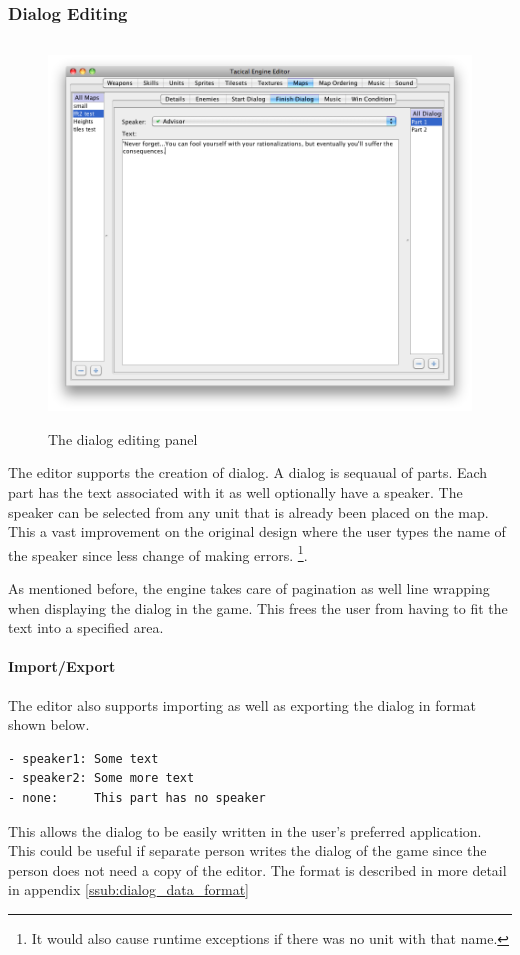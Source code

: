 \clearpage
\subsubsection{Dialog Editing}
\label{ssub:dialog_editing}

\begin{figure}[htbp]
	\centering
		\includegraphics[height=4in]{figures/editor/Maps-dialog.png}
	\caption{The dialog editing panel}
	\label{fig:figures_editor_Maps-dialog}
\end{figure}
The editor supports the creation of dialog.  A dialog is sequaual of parts. Each part has the text  associated with it as well optionally have a speaker.  The speaker can be selected from any unit that is already been placed on the map. This a vast improvement on the original design where the user types the name of the speaker since less change of making errors. \footnote{It would also cause runtime exceptions if there was no unit with that name.}.

As mentioned before, the engine takes care of pagination as well line wrapping when displaying the dialog in the game. This frees the user from having to fit the text into a specified area. 

\paragraph{Import/Export\\}
The editor also supports importing as well as exporting the dialog in format shown below. 
\begin{lstlisting}[caption=Shows the format used  for the dialog]
- speaker1: Some text 
- speaker2: Some more text
- none:     This part has no speaker
\end{lstlisting}
This allows the dialog to be easily written in the user's preferred application.  This could be useful if separate person writes the dialog of the game since the person does not need a copy of the editor. The format is described in more detail in appendix \ref{ssub:dialog_data_format}  


